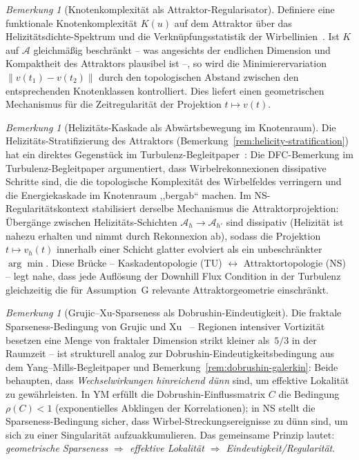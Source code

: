 \documentclass[12pt,a4paper]{article}
\theoremstyle{definition}
\theoremstyle{plain}
\theoremstyle{remark}
\newtheorem{remark}[definition]{Bemerkung}
\begin{document}
\begin{remark}[Knotenkomplexität als Attraktor-Regularisator]
\label{rem:knot-complexity}
Definiere eine funktionale Knotenkomplexität $K(u)$ auf dem Attraktor
über das Helizitätsdichte-Spektrum und die Verknüpfungsstatistik
der Wirbellinien~\cite{Moffatt69}. Ist $K$ auf $\mathcal{A}$
gleichmäßig beschränkt -- was angesichts der endlichen Dimension
und Kompaktheit des Attraktors plausibel ist --, so wird die
Minimierervariation $\|v(t_1) - v(t_2)\|$ durch den topologischen
Abstand zwischen den entsprechenden Knotenklassen kontrolliert. Dies
liefert einen geometrischen Mechanismus für die Zeitregularität der
Projektion $t \mapsto v(t)$.
\end{remark}

\begin{remark}[Helizitäts-Kaskade als Abwärtsbewegung im Knotenraum]
\label{rem:helicity-cascade-bridge}
Die Helizitäts-Stratifizierung des Attraktors
(Bemerkung~\ref{rem:helicity-stratification}) hat ein direktes
Gegenstück im Turbulenz-Begleitpaper~\cite{FST-TU2026}:
Die DFC-Bemerkung im Turbulenz-Begleitpaper argumentiert, dass Wirbelrekonnexionen dissipative
Schritte sind, die die topologische Komplexität des Wirbelfeldes
verringern und die Energiekaskade im Knotenraum ,,bergab`` machen.
Im NS-Regularitätskontext stabilisiert derselbe Mechanismus die
Attraktorprojektion: Übergänge zwischen Helizitäts-Schichten
$\mathcal{A}_h \to \mathcal{A}_{h'}$ sind dissipativ (Helizität
ist nahezu erhalten und nimmt durch Rekonnexion ab), sodass die
Projektion $t \mapsto v_h(t)$ innerhalb einer Schicht glatter
evolviert als ein unbeschränkter $\arg\min$. Diese Brücke --
Kaskadentopologie (TU) $\leftrightarrow$ Attraktortopologie (NS) --
legt nahe, dass jede Auflösung der Downhill Flux Condition in der
Turbulenz gleichzeitig die für Assumption~G relevante
Attraktorgeometrie einschränkt.
\end{remark}

\begin{remark}[Grujic--Xu-Sparseness als Dobrushin-Eindeutigkeit]
\label{rem:sparseness-dobrushin}
Die fraktale Sparseness-Bedingung von Grujic und
Xu~\cite{GrujicXu2025} -- Regionen intensiver Vortizität besetzen
eine Menge von fraktaler Dimension strikt kleiner als~$5/3$ in der
Raumzeit -- ist strukturell analog zur Dobrushin-Eindeutigkeitsbedingung
aus dem Yang--Mills-Begleitpaper und
Bemerkung~\ref{rem:dobrushin-galerkin}: Beide behaupten, dass
\emph{Wechselwirkungen hinreichend dünn} sind, um effektive Lokalität
zu gewährleisten. In YM erfüllt die Dobrushin-Einflussmatrix $C$ die
Bedingung $\rho(C) < 1$ (exponentielles Abklingen der Korrelationen);
in NS stellt die Sparseness-Bedingung sicher, dass
Wirbel-Streckungsereignisse zu dünn sind, um sich zu einer
Singularität aufzuakkumulieren. Das gemeinsame Prinzip lautet:
\emph{geometrische Sparseness $\Rightarrow$ effektive Lokalität
$\Rightarrow$ Eindeutigkeit/Regularität}.
\end{remark}
\end{document}
